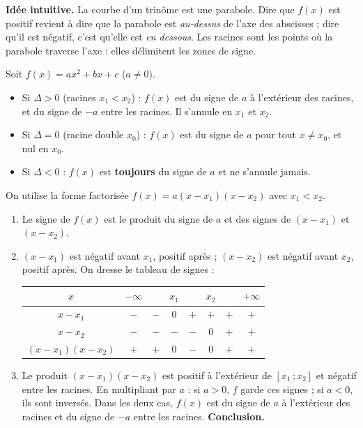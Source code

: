 \documentclass[11pt]{article}
\newcommand{\cle}[1]{{\popxbold\color{popdark}#1}}
\newcounter{popsec}
\newcounter{popsub}
\newcommand{\courssub}[1]{%
  \stepcounter{popsub}%
  \par\vspace{9pt}\noindent{\popxbold\fontsize{11.5}{13}\selectfont\color{popink}{\color{poporange}\thepopsec.\thepopsub}\hspace{6pt}#1}\par\nopagebreak\vspace{4pt}
}
\begin{document}
\courssub{Signe du trinôme}

\textbf{Idée intuitive.} La courbe d'un trinôme est une parabole. Dire que $f(x)$ est positif revient à dire que la parabole est \emph{au-dessus} de l'axe des abscisses ; dire qu'il est négatif, c'est qu'elle est \emph{en dessous}. Les racines sont les points où la parabole traverse l'axe : elles délimitent les zones de signe.

\begin{propriete}
Soit $f(x)=ax^2+bx+c$ ($a\neq 0$).
\begin{itemize}
\item Si $\Delta>0$ (racines $x_1<x_2$) : $f(x)$ est du \cle{signe de $a$} à l'extérieur des racines, et du \cle{signe de $-a$} entre les racines. Il s'annule en $x_1$ et $x_2$.
\item Si $\Delta=0$ (racine double $x_0$) : $f(x)$ est du \cle{signe de $a$} pour tout $x\neq x_0$, et nul en $x_0$.
\item Si $\Delta<0$ : $f(x)$ est \textbf{toujours} du \cle{signe de $a$} et ne s'annule jamais.
\end{itemize}
\end{propriete}

\begin{experience}
On utilise la forme factorisée $f(x)=a(x-x_1)(x-x_2)$ avec $x_1<x_2$.
\begin{enumerate}
\item Le signe de $f(x)$ est le produit du signe de $a$ et des signes de $(x-x_1)$ et $(x-x_2)$.
\item $(x-x_1)$ est négatif avant $x_1$, positif après ; $(x-x_2)$ est négatif avant $x_2$, positif après. On dresse le tableau de signes :
\begin{center}
\begin{tabular}{|c|ccccccc|}\hline
$x$ & $-\infty$ & & $x_1$ & & $x_2$ & & $+\infty$ \\ \hline
$x-x_1$ & $-$ & $-$ & $0$ & $+$ & $+$ & $+$ & $+$ \\ \hline
$x-x_2$ & $-$ & $-$ & $-$ & $-$ & $0$ & $+$ & $+$ \\ \hline
$(x-x_1)(x-x_2)$ & $+$ & $+$ & $0$ & $-$ & $0$ & $+$ & $+$ \\ \hline
\end{tabular}
\end{center}
\item Le produit $(x-x_1)(x-x_2)$ est positif à l'extérieur de $[x_1\,;x_2]$ et négatif entre les racines. En multipliant par $a$ : si $a>0$, $f$ garde ces signes ; si $a<0$, ils sont inversés. Dans les deux cas, $f(x)$ est du signe de $a$ à l'extérieur des racines et du signe de $-a$ entre les racines. \textbf{Conclusion.}
\end{enumerate}
\end{experience}
\end{document}
